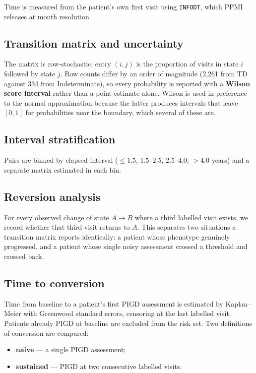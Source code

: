 \documentclass[11pt,a4paper]{article}
\newcommand{\code}[1]{\texttt{\small #1}}
\begin{document}
Time is measured from the patient's own first visit using \code{INFODT}, which
PPMI releases at month resolution.

\subsection{Transition matrix and uncertainty}

The matrix is row-stochastic: entry $(i,j)$ is the proportion of visits in
state $i$ followed by state $j$. Row counts differ by an order of magnitude
(2{,}261 from TD against 334 from Indeterminate), so every probability is
reported with a \textbf{Wilson score interval} rather than a point estimate
alone. Wilson is used in preference to the normal approximation because the
latter produces intervals that leave $[0,1]$ for probabilities near the
boundary, which several of these are.

\subsection{Interval stratification}

Pairs are binned by elapsed interval ($\leq 1.5$, $1.5$--$2.5$, $2.5$--$4.0$,
$> 4.0$ years) and a separate matrix estimated in each bin.

\subsection{Reversion analysis}

For every observed change of state $A \rightarrow B$ where a third labelled
visit exists, we record whether that third visit returns to $A$. This separates
two situations a transition matrix reports identically: a patient whose
phenotype genuinely progressed, and a patient whose single noisy assessment
crossed a threshold and crossed back.

\subsection{Time to conversion}

Time from baseline to a patient's first PIGD assessment is estimated by
Kaplan--Meier with Greenwood standard errors, censoring at the last labelled
visit. Patients already PIGD at baseline are excluded from the risk set. Two
definitions of conversion are compared:

\begin{itemize}
  \item \textbf{naive} --- a single PIGD assessment;
  \item \textbf{sustained} --- PIGD at two consecutive labelled visits.
\end{itemize}
\end{document}
